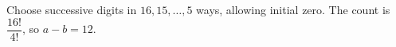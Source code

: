 Choose successive digits in $16,15,\ldots,5$ ways, allowing initial zero. The count is $\dfrac{16!}{4!}$, so $\boxed{a-b=12}$.
